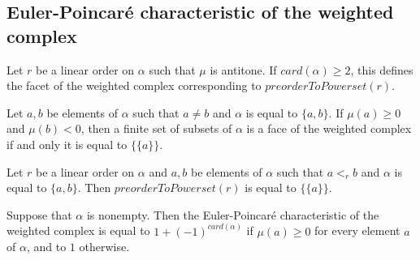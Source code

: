 \subsection{Euler-Poincaré characteristic of the weighted complex}

\begin{subdefi}[FacetWeightedComplexofLinearOrder]
Let $r$ be a linear order on $\alpha$ such that $\mu$ is antitone. If $card(\alpha)\geq 2$, this defines the facet of the weighted complex
corresponding to $preorderToPowerset(r)$.

\end{subdefi}

\begin{sublemma}
Let $a,b$ be elements of $\alpha$ such that $a\ne b$ and $\alpha$ is equal to $\{a,b\}$.  If $\mu(a)\geq 0$ and $\mu(b)<0$, then a finite set
of subsets of $\alpha$ is a face of the weighted complex if and only it is equal to $\{\{a\}\}$.

\end{sublemma}

\begin{sublemma}
Let $r$ be a linear order on $\alpha$ and $a,b$ be elements of $\alpha$ such that $a<_r b$ and $\alpha$ is equal to $\{a,b\}$.  Then 
$preorderToPowerset(r)$ is equal to $\{\{a\}\}$.

\end{sublemma}

\begin{sublemma}
Suppose that $\alpha$ is nonempty. Then the Euler-Poincaré characteristic of the weighted complex is equal to $1+(-1)^{card(\alpha)}$ if
$\mu(a)\geq 0$ for every element $a$ of $\alpha$, and to $1$ otherwise. 

\end{sublemma}


